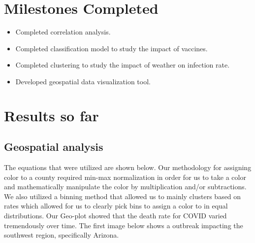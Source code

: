 \documentclass[sigconf,screen,nonacm]{acmart}
\begin{document}
\section{Milestones Completed}
\begin{itemize}
    \item Completed correlation analysis.
    \item Completed classification model to study the impact of vaccines.
    \item Completed clustering to study the impact of weather on infection rate.
    \item Developed geospatial data visualization tool.
\end{itemize}


\section{Results so far}


\subsection{Geospatial analysis}
The equations that were utilized are shown below. Our methodology for assigning color to a county required min-max normalization in order for us to take a color and mathematically manipulate the color by multiplication and/or subtractions. We also utilized a binning method that allowed us to mainly clusters based on rates which allowed for us to clearly pick bins to assign a color to in equal distributions. Our Geo-plot showed that the death rate for COVID varied tremendously over time. The first image below shows a outbreak impacting the southwest region, specifically Arizona.
\end{document}
